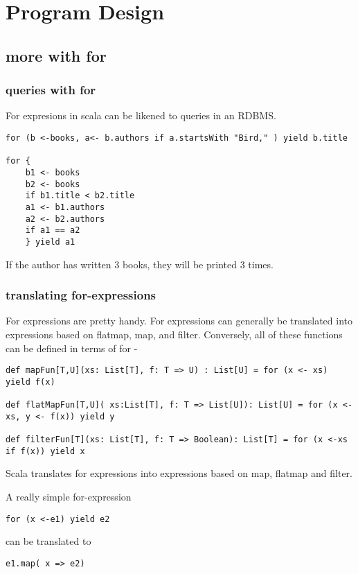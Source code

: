 \part{Program Design}
\chapter{more with for}
\section{queries with for}

For expresions in scala can be likened to queries in an RDBMS.

\begin{lstlisting}
for (b <-books, a<- b.authors if a.startsWith "Bird," ) yield b.title

for { 
	b1 <- books
	b2 <- books
	if b1.title < b2.title
	a1 <- b1.authors
	a2 <- b2.authors
	if a1 == a2
	} yield a1
\end{lstlisting}

If the author has written 3 books, they will be printed 3 times.

\section{translating for-expressions}
For expressions are pretty handy. For expressions can generally be translated into expressions based on flatmap, map, and filter. Conversely, all of these functions can be defined in terms of for - 
\begin{lstlisting}
def mapFun[T,U](xs: List[T], f: T => U) : List[U] = for (x <- xs) yield f(x)

def flatMapFun[T,U]( xs:List[T], f: T => List[U]): List[U] = for (x <- xs, y <- f(x)) yield y

def filterFun[T](xs: List[T], f: T => Boolean): List[T] = for (x <-xs if f(x)) yield x

\end{lstlisting}

Scala translates for expressions into expressions based on map, flatmap and filter.

A really simple for-expression
\begin{lstlisting}
for (x <-e1) yield e2
\end{lstlisting}
can be translated to
\begin{lstlisting}
e1.map( x => e2)
\end{lstlisting}

